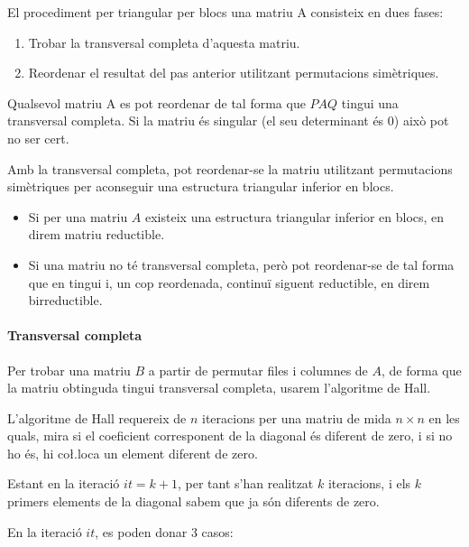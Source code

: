 \documentclass[11pt,a4paper,twoside]{report}
\begin{document}
El procediment per triangular per blocs una matriu A consisteix en dues fases:
\begin{enumerate}
\item Trobar la transversal completa d'aquesta matriu.
\item Reordenar el resultat del pas anterior utilitzant permutacions simètriques.
\end{enumerate}

Qualsevol matriu A es pot reordenar de tal forma que $PAQ$ tingui una transversal completa. Si la matriu és singular (el seu determinant és 0) això pot no ser cert.

Amb la transversal completa, pot reordenar-se la matriu utilitzant permutacions simètriques per aconseguir una estructura triangular inferior en blocs.

\begin{itemize}
\item Si per una matriu $A$ existeix una estructura triangular inferior en blocs, en direm matriu reductible.\\
\item Si una matriu no té transversal completa, però pot reordenar-se de tal forma que en tingui i, un cop reordenada, continuï siguent reductible, en direm birreductible.
\end{itemize}

\paragraph{Transversal completa} \mbox{}

Per trobar una matriu $B$ a partir de permutar files i columnes de $A$, de forma que la matriu obtinguda tingui transversal completa, usarem l'algoritme de Hall.

L'algoritme de Hall requereix de $n$ iteracions per una matriu de mida $n \times n$ en les quals, mira si el coeficient corresponent de la diagonal és diferent de zero, i si no ho és, hi co\l.loca un element diferent de zero.

Estant en la iteració $it = k+1$, per tant s'han realitzat $k$ iteracions, i els $k$ primers elements de la diagonal sabem que ja són diferents de zero. 

En la iteració $it$, es poden donar 3 casos:
\end{document}
